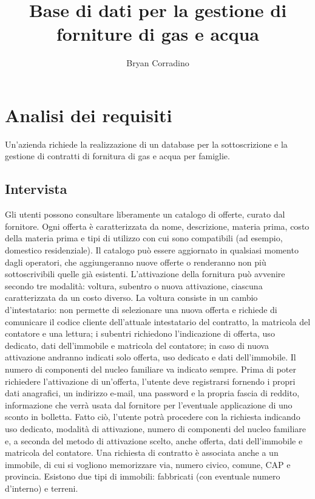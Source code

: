 \documentclass[a4paper,12pt]{report}
\title
{\Large \textbf{Base di dati per la gestione di forniture di gas e acqua} \\[10pt]
}
\author{Bryan Corradino}
\affil{0000920992 \\ bryan.corradino@studio.unibo.it}
\begin{document}
\maketitle

\tableofcontents

\chapter{Analisi dei requisiti}
Un'azienda richiede la realizzazione di un database per la sottoscrizione e la gestione di contratti di fornitura di gas e acqua per famiglie.
\section{Intervista}
\begin{mdframed}
Gli utenti possono consultare liberamente un catalogo di offerte, curato dal fornitore. Ogni offerta è caratterizzata da nome, descrizione, materia prima, costo della materia prima e tipi di utilizzo con cui sono compatibili (ad esempio, domestico residenziale). Il catalogo può essere aggiornato in qualsiasi momento dagli operatori, che aggiungeranno nuove offerte o renderanno non più sottoscrivibili quelle già esistenti.
\newline
L'attivazione della fornitura può avvenire secondo tre modalità: voltura, subentro o nuova attivazione, ciascuna caratterizzata da un costo diverso. La voltura consiste in un cambio d'intestatario: non permette di selezionare una nuova offerta e richiede di comunicare il codice cliente dell'attuale intestatario del contratto, la matricola del contatore e una lettura; i subentri richiedono l'indicazione di offerta, uso dedicato, dati dell'immobile e matricola del contatore; in caso di nuova attivazione andranno indicati solo offerta, uso dedicato e dati dell'immobile. Il numero di componenti del nucleo familiare va indicato sempre.
\newline
Prima di poter richiedere l'attivazione di un'offerta, l'utente deve registrarsi fornendo i propri dati anagrafici, un indirizzo e-mail, una password e la propria fascia di reddito, informazione che verrà usata dal fornitore per l'eventuale applicazione di uno sconto in bolletta. Fatto ciò, l'utente potrà procedere con la richiesta indicando uso dedicato, modalità di attivazione, numero di componenti del nucleo familiare e, a seconda del metodo di attivazione scelto, anche offerta, dati dell'immobile e matricola del contatore.
\newline
Una richiesta di contratto è associata anche a un immobile, di cui si vogliono memorizzare via, numero civico, comune, CAP e provincia. Esistono due tipi di immobili: fabbricati (con eventuale numero d'interno) e terreni.

\end{mdframed}
\end{document}
